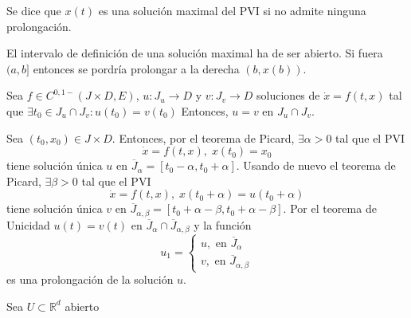 \begin{defn}
  Se dice que $x(t)$ es una solución maximal del PVI si no admite ninguna prolongación.
\end{defn}

\begin{obs}
  El intervalo de definición de una solución maximal ha de ser abierto. Si fuera $(a, b]$ entonces se pordría prolongar a la derecha $(b, x(b))$.
\end{obs}

\begin{theo}
  Sea $f \in C^{0,1-}(J \times D, E)$, $u: J_{u} \to D$ y $v: J_{v} \to D$ soluciones de $\dot{x} = f(t, x)$ tal que $\exists t_{0} \in J_{u} \cap J_{v}: u(t_{0}) = v(t_{0})$ Entonces, $u = v$ en $ J_{u} \cap J_{v}$.
\end{theo}

\begin{ejm}
  Sea $(t_{0}, x_{0}) \in J \times D$. Entonces, por el teorema de Picard, $\exists \alpha >0$ tal que el PVI
  \[ 
    \dot{x} = f(t, x), \; x(t_{0}) = x_{0}  
  \] 
  tiene solución única $u$ en $\overline{J}_{\alpha} = [t_{0} - \alpha, t_{0} + \alpha]$. Usando de nuevo el teorema de Picard, $\exists \beta >0$ tal que el PVI
  \[ 
    \dot{x} = f(t,x), \; x(t_{0} + \alpha) = u(t_{0} + \alpha) 
  \] 
tiene solución única $v$ en $\overline{J}_{\alpha, \beta} = [t_{0} + \alpha - \beta, t_{0} + \alpha - \beta]$. Por el teorema de Unicidad $u(t) = v(t)$ en $\overline{J}_{\alpha} \cap \overline{J}_{\alpha, \beta}$ y la función
  \[ 
    u_{1}  =
    \begin{cases}
      u, \text{ en } \overline{J}_{\alpha} \\
      v, \text{ en } \overline{J}_{\alpha, \beta}
    \end{cases} 
  \] 
  es una prolongación de la solución $u$.
\end{ejm}

\begin{theo}
  Sea $U \subset \mathbb{R}^{d}$ abierto
\end{theo}
